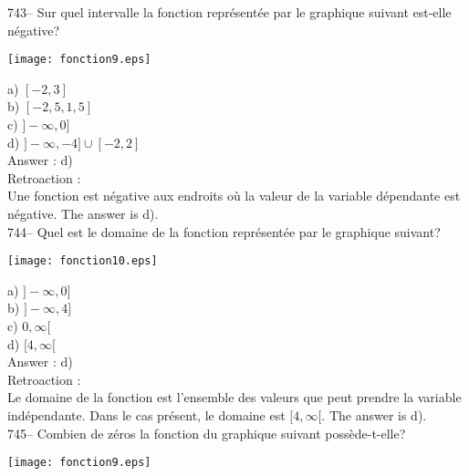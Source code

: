 ﻿\documentclass[letterpaper, 12pt]{article}
\begin{document}
743-- Sur quel intervalle la fonction repr\'esent\'ee par le graphique
suivant est-elle n\'egative?\\

    \begin{center}
    \texttt{[image: fonction9.eps]}
    \end{center}

a) $[-2, 3]$\\
b) $[-2,5, 1,5]$\\
c) $]-\infty,0]$\\
d) $]-\infty,-4]\cup[-2,2]$\\

Answer : d)\\

Retroaction : \\
Une fonction est n\'egative aux endroits o\`u la valeur de la variable
d\'ependante est n\'egative.  The answer is d).\\

744-- Quel est le domaine de la fonction repr\'esent\'ee par le graphique
suivant?\\

    \begin{center}
    \texttt{[image: fonction10.eps]}
    \end{center}
a) $]-\infty,0]$\\
b) $]-\infty,4]$\\
c) $0,\infty[$\\
d) $[4, \infty[$\\

Answer : d)\\

Retroaction : \\
Le domaine de la fonction est l'ensemble des valeurs que peut prendre la
variable ind\'ependante.  Dans le cas pr\'esent, le domaine est $[4,
\infty[$.  The answer is d).\\

745-- Combien de z\'eros la fonction du graphique suivant
poss\`ede-t-elle?\\
    \begin{center}
    \texttt{[image: fonction9.eps]}
    \end{center}
\end{document}
